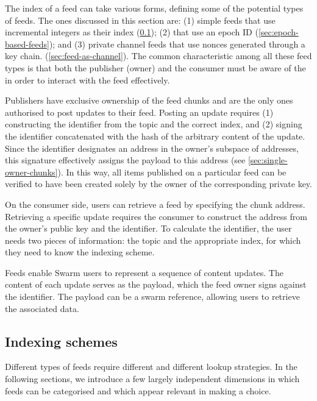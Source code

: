 The index of a feed can take various forms, defining some of the potential types of feeds. The ones discussed in this section are: (1) simple feeds that use incremental integers as their index (\ref{sec:indexing-schemes}); (2)   that use an epoch ID (\ref{sec:epoch-based-feeds}); and (3) private channel feeds that use nonces generated through a  key chain.  (\ref{sec:feed-as-channel}).
The common characteristic among all these feed types is that both the publisher (owner) and the consumer must be aware of the  in order to interact with the feed effectively. 

Publishers have exclusive ownership of the feed chunks and are the only ones authorised to post updates to their feed. Posting an update requires (1) constructing the identifier from the topic and the correct index, and (2) signing the identifier concatenated with the hash of the arbitrary content of the update. Since the identifier designates an address in the owner's subspace of addresses, this signature effectively assigns the payload to this address (see \ref{sec:single-owner-chunks}). In this way, all items published on a particular feed can be verified to have been created solely by the owner of the corresponding private key.

On the consumer side, users can retrieve a feed by specifying the chunk address. Retrieving a specific update requires the consumer to construct the address from the owner's public key and the identifier. To calculate the identifier, the user needs two pieces of information: the topic and the appropriate index, for which they need to know the indexing scheme. 

Feeds enable Swarm users to represent a sequence of content updates. The content of each update serves as the payload, which the feed owner signs against the identifier. The payload can be a swarm reference, allowing users to retrieve the associated data.

\subsection{Indexing schemes \statusyellow}\label{sec:indexing-schemes}

Different types of feeds require different  and different lookup strategies. In the following sections, we introduce a few largely independent dimensions in which feeds can be categorised and which appear relevant in making a choice.


